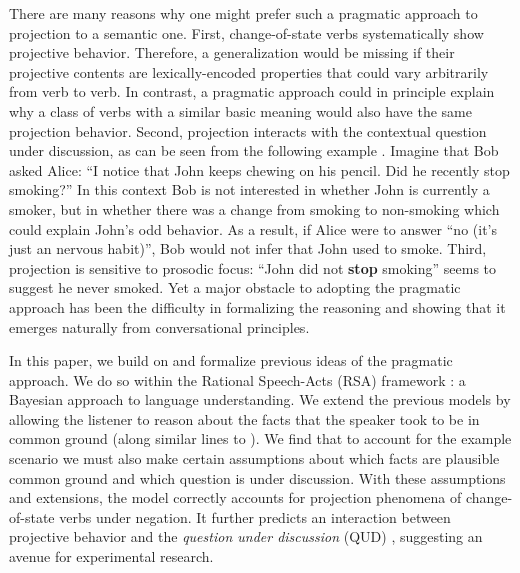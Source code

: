 \documentclass[10pt,letterpaper]{article}
\begin{document}
 
  There are many reasons why one might prefer such a pragmatic approach to projection to a 
 semantic one. 
First, change-of-state verbs systematically show projective behavior. 
Therefore, a generalization would be missing if their projective contents are
 lexically-encoded properties that could vary arbitrarily from verb to verb. In contrast, a pragmatic approach could in principle explain why a class of verbs with a similar basic meaning would also have the same projection behavior.
Second, projection interacts with the contextual question under discussion,
 as can be seen from the following example \cite{Geurts1995:Presupposing}.
Imagine that Bob asked Alice: ``I notice that John keeps chewing on his pencil. Did he recently stop smoking?''
In this context Bob is not interested in whether John is currently a smoker, but in whether there was a change from smoking to non-smoking which could explain John's odd behavior. 
As a result, if Alice were to answer ``no (it's just an nervous habit)'', Bob would not infer that John used to smoke. 
Third, projection is sensitive to prosodic focus: ``John did not \textbf{stop} smoking'' seems to suggest he never smoked.
Yet a major obstacle to adopting the pragmatic approach has been the difficulty in formalizing the reasoning and showing that it emerges naturally from conversational principles.
 
In this paper, we build on and formalize previous ideas of the pragmatic approach.
We do so within the Rational Speech-Acts (RSA) framework  \cite{FrankGoodman2012:Predicting-Pragmatic-Reasoning-,GoodmanStuhlmuller2013:Knowledge-and-I}: a Bayesian 
approach to language understanding.
We extend the previous models by allowing the listener to reason about the facts that the speaker took to be in common ground (along similar lines to ).
We find that to account for the example scenario we must also make certain assumptions about which facts are plausible common ground and which question is under discussion.
With these assumptions and extensions, the model correctly accounts for projection phenomena of change-of-state verbs under negation.
It further predicts an interaction between projective behavior and the  
 \emph{question under discussion} (QUD) \cite{Roberts2012:Information-Structure}, suggesting an avenue for experimental research.

\end{document}

